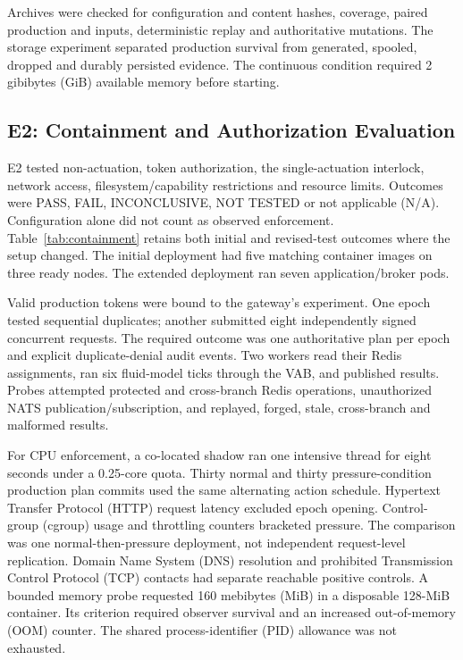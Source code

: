 \documentclass[conference,letterpaper]{IEEEtran}
\begin{document}
Archives were checked for configuration and content hashes, coverage, paired
production and inputs, deterministic replay and authoritative mutations.
The storage experiment separated production survival from generated, spooled,
dropped and durably persisted evidence. The continuous condition required
2 gibibytes (GiB) available memory before starting.

\subsection{E2: Containment and Authorization Evaluation}
E2 tested non-actuation, token authorization, the single-actuation interlock,
network access, filesystem/capability restrictions and resource limits.
Outcomes were PASS, FAIL, INCONCLUSIVE, NOT TESTED or not applicable (N/A).
Configuration alone did not count as observed enforcement. Table~\ref{tab:containment}
retains both initial and revised-test outcomes where the setup changed.
The initial deployment had five matching container images on three ready nodes.
The extended deployment ran seven application/broker pods.

Valid production tokens were bound to the gateway's experiment. One epoch
tested sequential duplicates; another submitted eight independently signed
concurrent requests. The required outcome was one authoritative plan per epoch
and explicit duplicate-denial audit events. Two workers read their Redis
assignments, ran six fluid-model ticks through the VAB, and published results.
Probes attempted protected and cross-branch Redis operations, unauthorized NATS
publication/subscription, and replayed, forged, stale, cross-branch and malformed
results.

For CPU enforcement, a co-located shadow ran one intensive thread for eight
seconds under a 0.25-core quota. Thirty normal and thirty pressure-condition
production plan commits used the same alternating action schedule. Hypertext
Transfer Protocol (HTTP) request latency excluded epoch opening. Control-group
(cgroup) usage and throttling counters bracketed pressure. The comparison was
one normal-then-pressure deployment, not independent request-level replication.
Domain Name System (DNS) resolution and prohibited Transmission Control
Protocol (TCP) contacts had separate reachable positive controls.
A bounded memory probe requested 160 mebibytes (MiB) in a disposable 128-MiB container.
Its criterion required observer survival and an increased out-of-memory (OOM)
counter. The shared process-identifier (PID) allowance was not exhausted.
\end{document}
